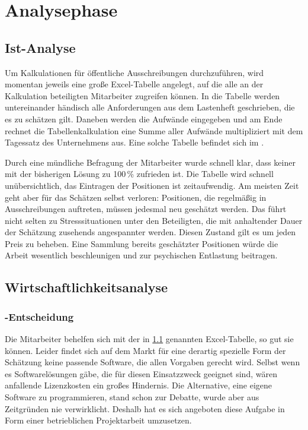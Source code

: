 \section{Analysephase} 
\label{sec:Analysephase} 

\subsection{Ist-Analyse} 
\label{sec:IstAnalyse}
Um Kalkulationen für öffentliche Ausschreibungen durchzuführen, wird momentan
jeweils eine große Excel-Tabelle angelegt, auf die alle an der Kalkulation
beteiligten Mitarbeiter zugreifen können. In die Tabelle werden
untereinander händisch alle Anforderungen aus dem Lastenheft geschrieben, die es
zu schätzen gilt. Daneben werden die Aufwände eingegeben und am Ende rechnet
die Tabellenkalkulation eine Summe aller Aufwände multipliziert mit
dem Tagessatz des Unternehmens aus. Eine solche Tabelle befindet sich im
.

Durch eine mündliche Befragung der Mitarbeiter wurde schnell klar, dass keiner
mit der bisherigen Lösung zu 100\,\% zufrieden ist. Die Tabelle wird schnell
unübersichtlich, das Eintragen der Positionen ist zeitaufwendig. Am meisten Zeit
geht aber für das Schätzen selbst verloren: Positionen, die regelmäßig in
Ausschreibungen auftreten, müssen jedesmal neu geschätzt werden. Das führt
nicht selten zu Stresssituationen unter den Beteiligten, die mit anhaltender
Dauer der Schätzung zusehends angespannter werden. Diesen Zustand gilt es um
jeden Preis zu beheben. Eine Sammlung bereits geschätzter Positionen würde die
Arbeit wesentlich beschleunigen und zur psychischen Entlastung beitragen.

\subsection{Wirtschaftlichkeitsanalyse}
\label{sec:Wirtschaftlichkeitsanalyse}

\subsubsection{-Entscheidung}
\label{sec:MakeOrBuyEntscheidung}
Die Mitarbeiter behelfen sich mit der in
\ref{sec:IstAnalyse} genannten Excel-Tabelle, so gut sie
können. Leider findet sich auf dem Markt für eine derartig spezielle Form der
Schätzung keine passende Software, die allen Vorgaben gerecht wird. Selbst wenn
es Softwarelösungen gäbe, die für diesen Einsatzzweck geeignet sind, wären
anfallende Lizenzkosten ein großes Hindernis. 
Die Alternative, eine eigene Software zu programmieren, stand schon zur
Debatte, wurde aber aus Zeitgründen nie verwirklicht. Deshalb hat es sich
angeboten diese Aufgabe in Form einer betrieblichen Projektarbeit umzusetzen.


